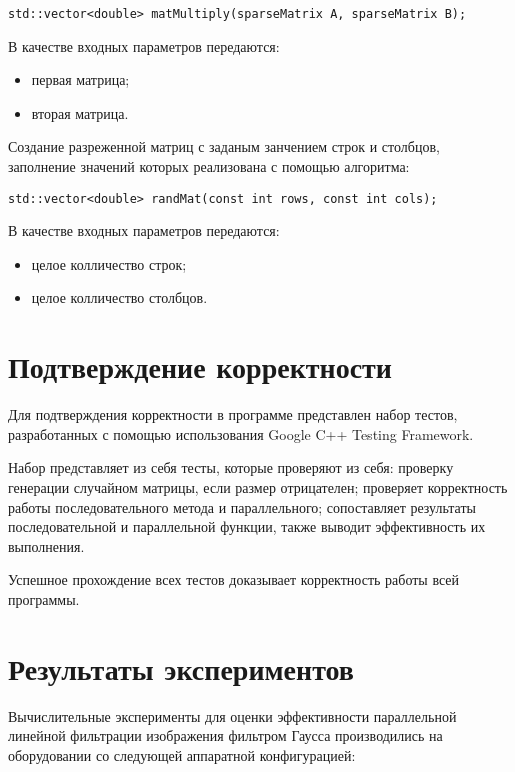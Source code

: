 \documentclass{report}
\begin{document}
\begin{lstlisting}
std::vector<double> matMultiply(sparseMatrix A, sparseMatrix B);
\end{lstlisting}
\par В качестве входных параметров передаются:
\begin{itemize}
\item первая матрица;
\item вторая матрица.
\end{itemize}
\par Создание разреженной матриц с заданым занчением строк и столбцов, заполнение значений которых реализована с помощью алгоритма:
\begin{lstlisting}
std::vector<double> randMat(const int rows, const int cols);
\end{lstlisting}
\par В качестве входных параметров передаются:
\begin{itemize}
\item целое колличество строк;
\item целое колличество столбцов.
\end{itemize}
\newpage

\section*{Подтверждение корректности}
Для подтверждения корректности в программе представлен набор тестов, разработанных с помощью использования Google C++ Testing Framework.
\par Набор представляет из себя тесты, которые проверяют из себя: проверку генерации случайном матрицы, если размер отрицателен; проверяет корректность работы последовательного метода и параллельного; сопоставляет результаты последовательной и параллельной функции, также выводит эффективность их выполнения.
\par Успешное прохождение всех тестов доказывает корректность работы всей программы.
\newpage

\section*{Результаты экспериментов}
Вычислительные эксперименты для оценки эффективности параллельной линейной фильтрации изображения фильтром Гаусса производились на оборудовании со следующей аппаратной конфигурацией:
\end{document}
